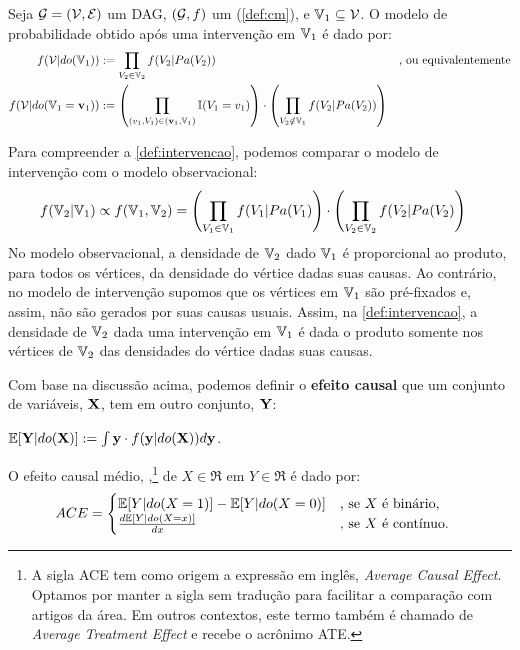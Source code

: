 \begin{definition}
 \label{def:intervencao}
 Seja ${\mathcal G} = ({\mathcal V}, {\mathcal E})$ um DAG,
 $({\mathcal G},f)$ um \CM (\cref{def:cm}), e
 ${\mathbb V}_1 \subseteq {\mathcal V}$. 
 O modelo de probabilidade obtido após
 uma intervenção em ${\mathbb V}_1$ é dado por:
 \begin{align*}
  f({\mathcal V}|do({\mathbb V}_1))
  &:= \prod_{V_2 \in {\mathbb V}_2} f(V_2|Pa(V_2))
  &\text{, ou equivalentemente} \\
  f({\mathcal V}|do({\mathbb V}_1 = {\mathbf{v}}_1))
  &:= \left(\prod_{(v_1,V_1) \in ({\mathbf{v}}_1,{\mathbb V}_1)} {\mathbb I}(V_1 = v_1)\right)
  \cdot \left(\prod_{V_2 \notin {\mathbb V}_1} f(V_2|Pa(V_2))\right)
 \end{align*}
\end{definition}
Para compreender a \cref{def:intervencao}, 
podemos comparar o modelo de intervenção com
o modelo observacional:
\begin{align*}
 f({\mathbb V}_2|{\mathbb V}_1)
 &\propto f({\mathbb V}_1,{\mathbb V}_2)
 = \left(\prod_{V_1 \in {\mathbb V}_1}f(V_1|Pa(V_1)\right) \cdot
   \left(\prod_{V_2 \in {\mathbb V}_2}f(V_2|Pa(V_2)\right)
\end{align*}
No modelo observacional, a densidade de ${\mathbb V}_2$ dado ${\mathbb V}_1$ é
proporcional ao produto, para todos os vértices,
da densidade do vértice dadas suas causas.
Ao contrário, no modelo de intervenção supomos que
os vértices em ${\mathbb V}_1$ são pré-fixados e, assim,
não são gerados por suas causas usuais.
Assim, na \cref{def:intervencao},
a densidade de ${\mathbb V}_2$ dada uma intervenção em ${\mathbb V}_1$ é
dada o produto somente nos vértices de ${\mathbb V}_2$
das densidades do vértice dadas suas causas.

Com base na discussão acima, podemos definir
o \textbf{efeito causal} que um conjunto de variáveis, ${\mathbf{X}}$,
tem em outro conjunto, ${\mathbf{Y}}$:

\begin{definition}
 \label{def:exp_inter}
 ${\mathbb E}[{\mathbf{Y}}|do({\mathbf{X}})] := \int {\mathbf{y}} \cdot f({\mathbf{y}}|do({\mathbf{X}})) d{\mathbf{y}}$.
\end{definition}

\begin{definition}
 \label{def:ace}
 O efeito causal médio, \ACE,\footnote{
 A sigla ACE tem como origem a expressão em inglês,
 \textit{Average Causal Effect}. Optamos por manter a sigla 
 sem tradução para facilitar a comparação com artigos da área.
 Em outros contextos, este termo também é chamado de 
 \textit{Average Treatment Effect} e recebe o acrônimo ATE.}
 de $X \in \Re$ em $Y \in \Re$ é dado por:
 \begin{align*}
  {ACE} &=
  \begin{cases}
   {\mathbb E}[Y|do(X=1)] - {\mathbb E}[Y|do(X=0)]
   & \text{, se $X$ é binário}, \\
   \frac{d{\mathbb E}[Y|do(X=x)]}{dx}
   & \text{, se $X$ é contínuo}.
  \end{cases}
 \end{align*}
\end{definition}

